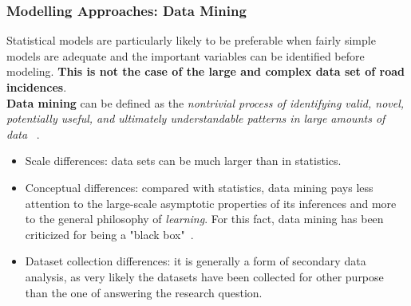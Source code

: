 \documentclass[hyperref={pdfpagelabels=true}]{beamer}
\begin{document}
\begin{frame}
\frametitle{Modelling Approaches: Data Mining}
Statistical models are particularly likely to be preferable when fairly simple models are adequate and the important variables can
be identified before modeling. \textbf{This is not the case of the large and complex data set of road incidences}.\\
\vspace{5mm}
\textbf{Data mining} can be defined as the \textit{nontrivial process of identifying valid, novel, potentially useful, and ultimately understandable patterns in large amounts of data} ~\cite{sets}.
\small{
\begin{itemize}
\item<1-> Scale differences: data sets can be much larger than in statistics.
\item<2-> Conceptual differences: compared with statistics, data mining pays less attention to the large-scale asymptotic properties of its inferences and more to the general philosophy of \textit{learning}. For this fact, data mining has been criticized for being a "black box"~\cite{zeng}.
\item<3-> Dataset collection differences: it is generally a form of secondary data analysis, as very likely the datasets have been collected for other purpose than the one of answering the research question.
\end{itemize}
}
\end{frame}
\end{document}
